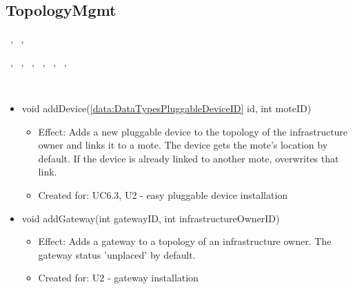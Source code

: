   \subsection{TopologyMgmt}\label{int:OnlineServiceOnlineServiceTopologyManagerTopologyMgmt}
    \begin{description}
      \item[Provided by:] \iconcomponent{}~, \iconcomponent{}~, \iconcomponent{}~
      \item[Required by:] \iconcomponent{}~, \iconcomponent{}~, \iconcomponent{}~, \iconcomponent{}~, \iconcomponent{}~, \iconcomponent{}~, \iconcomponent{}~
      \item[Operations:] ~
    \begin{itemize}[noitemsep,nolistsep,leftmargin=-.25cm]
      \item \textsf{void addDevice(\ref{data:DataTypesPluggableDeviceID} id, int moteID)}
        \begin{itemize}[noitemsep,nolistsep]
           \item Effect: Adds a new pluggable device to the topology of the infrastructure owner and links it to a mote. The device gets the mote's location by default. If the device is already linked to another mote, overwrites that link.
\item Created for: UC6.3, U2 - easy pluggable device installation
        \end{itemize}
      \item \textsf{void addGateway(int gatewayID, int infrastructureOwnerID)}
        \begin{itemize}[noitemsep,nolistsep]
           \item Effect: Adds a gateway to a topology of an infrastructure owner. The gateway status 'unplaced' by default.
\item Created for: U2 - gateway installation

\end{itemize}
\end{itemize}
\end{description}
